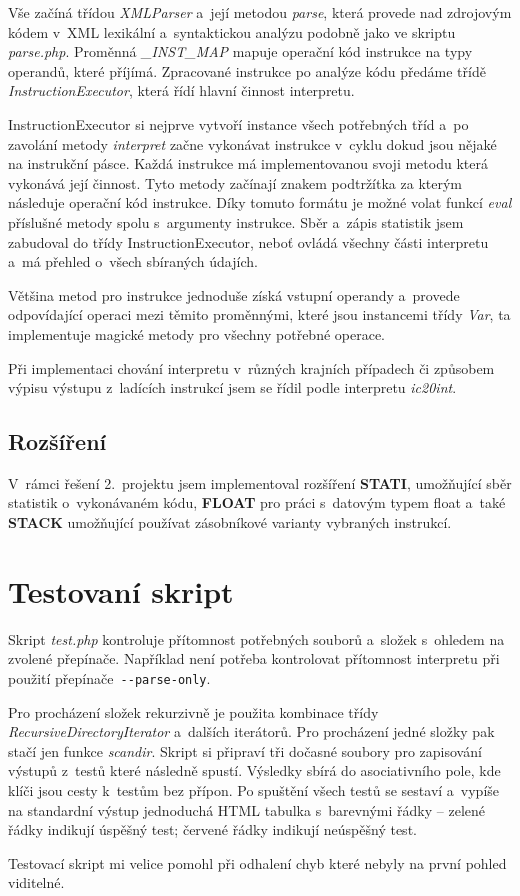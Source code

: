 \documentclass[10pt,a4paper]{article}
\begin{document}
    Vše začíná třídou \emph{XMLParser} a~její metodou \emph{parse}, která provede
    nad zdrojovým kódem v~XML lexikální a~syntaktickou analýzu podobně jako ve
    skriptu \emph{parse.php}. Proměnná \emph{\_INST\_MAP} mapuje operační kód instrukce
    na typy operandů, které příjímá. Zpracované instrukce po analýze kódu předáme třídě
    \emph{InstructionExecutor}, která řídí hlavní činnost interpretu.

    InstructionExecutor si nejprve vytvoří instance všech potřebných tříd a~po
    zavolání metody \emph{interpret} začne vykonávat instrukce v~cyklu dokud jsou
    nějaké na instrukční pásce. Každá instrukce má implementovanou svoji metodu která vykonává její činnost.
    Tyto metody začínají znakem podtržítka za kterým následuje operační kód instrukce.
    Díky tomuto formátu je možné volat funkcí \emph{eval} příslušné metody spolu
    s~argumenty instrukce. Sběr a~zápis statistik jsem zabudoval do třídy InstructionExecutor, neboť
    ovládá všechny části interpretu a~má přehled o~všech sbíraných údajích.

    Většina metod pro instrukce jednoduše získá vstupní operandy a~provede
    odpovídající operaci mezi těmito proměnnými, které jsou instancemi třídy \emph{Var},
    ta implementuje magické metody pro všechny potřebné operace.

    Při implementaci chování interpretu v~různých krajních případech či způsobem
    výpisu výstupu z~ladících instrukcí jsem se řídil podle interpretu \emph{ic20int}.

    \subsection{Rozšíření}

    V~rámci řešení 2.~projektu jsem implementoval rozšíření \textbf{STATI},
    umožňující sběr statistik o~vykonávaném kódu, \textbf{FLOAT} pro práci s~datovým
    typem float a~také \textbf{STACK} umožňující používat zásobníkové varianty
    vybraných instrukcí.

    \section{Testovaní skript}

    Skript \emph{test.php} kontroluje přítomnost potřebných souborů a~složek
    s~ohledem na zvolené přepínače. Například není potřeba kontrolovat přítomnost
    interpretu při použití přepínače\verb| --parse-only|.

    Pro procházení složek rekurzivně je použita kombinace třídy \emph{RecursiveDirectoryIterator}
    a~dalších iterátorů. Pro procházení jedné složky pak stačí jen funkce \emph{scandir}.
    Skript si připraví tři dočasné soubory pro zapisování výstupů z~testů které následně spustí.
    Výsledky sbírá do asociativního pole, kde klíči jsou cesty k~testům bez přípon.
    Po spuštění všech testů se sestaví a~vypíše na standardní výstup
    jednoduchá HTML tabulka s~barevnými řádky -- zelené řádky indikují úspěšný test; červené řádky indikují neúspěšný test.

    Testovací skript mi velice pomohl při odhalení chyb které nebyly na první pohled viditelné.
\end{document}
